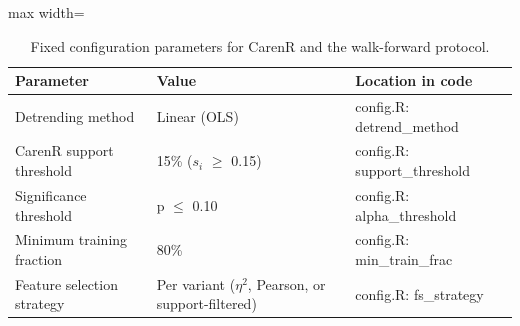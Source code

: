 \begin{table}[htbp]
  \centering
  \caption{Fixed configuration parameters for CarenR and the walk-forward protocol.}\label{tab:ch3d_7}
  \small
  \begin{adjustbox}{max width=\textwidth}
    \begin{tabularx}{\textwidth}{l|l|X}
  \toprule
  Parameter & Value & Location in code \\
  \midrule
  Detrending method & Linear (OLS) & config.R: detrend\_method \\
  CarenR support threshold & 15\% ($s_i$ $\geq$ 0.15) & config.R: support\_threshold \\
  Significance threshold & p $\leq$ 0.10 & config.R: alpha\_threshold \\
  Minimum training fraction & 80\% & config.R: min\_train\_frac \\
  Feature selection strategy & Per variant ($\eta$$^2$, Pearson, or support-filtered) & config.R: fs\_strategy \\
  \bottomrule
\end{tabularx}
  \end{adjustbox}
\end{table}
